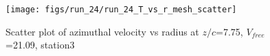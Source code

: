 \begin{figure}[H]
\centering
\texttt{[image: figs/run\_24/run\_24\_T\_vs\_r\_mesh\_scatter]}
\caption{Scatter plot of azimuthal velocity vs radius at $z/c$=7.75, $V_{free}$=21.09, station3}
\label{fig:run_24_T_vs_r_mesh_scatter}
\end{figure}


